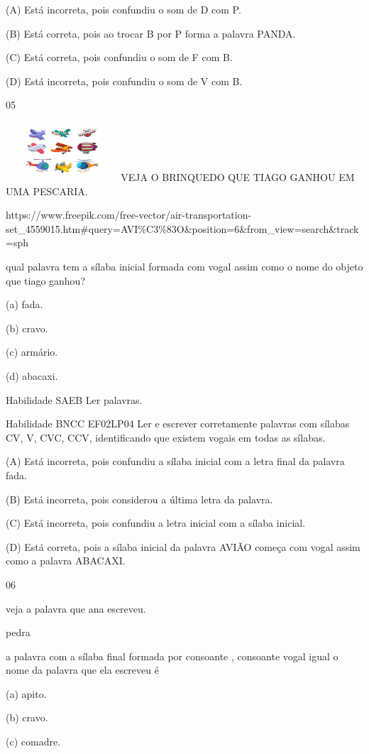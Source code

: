 {{{{{{(A) Está incorreta, pois confundiu o som de D com P.

(B) Está correta, pois ao trocar B por P forma a palavra PANDA.

(C) Está correta, pois confundiu o som de F com B.

(D) Está incorreta, pois confundiu o som de V com B.

\num{05}

\includegraphics[width=1.69097in,height=0.86538in]{media/image177.jpeg}VEJA
O BRINQUEDO QUE TIAGO GANHOU EM UMA PESCARIA.

https://www.freepik.com/free-vector/air-transportation-set\_4559015.htm\#query=AVI\%C3\%83O\&position=6\&from\_view=search\&track=sph

qual palavra tem a sílaba inicial formada com vogal assim como o nome do
objeto que tiago ganhou?

(a) fada.

(b) cravo.

(c) armário.

(d) abacaxi.

Habilidade SAEB Ler palavras.

Habilidade BNCC EF02LP04 Ler e escrever corretamente palavras com
sílabas CV, V, CVC, CCV, identificando que existem vogais em todas as
sílabas.

(A) Está incorreta, pois confundiu a sílaba inicial com a letra final da
palavra fada.

(B) Está incorreta, pois considerou a última letra da palavra.

(C) Está incorreta, pois confundiu a letra inicial com a sílaba inicial.

(D) Está correta, pois a sílaba inicial da palavra AVIÃO começa com
vogal assim como a palavra ABACAXI.

\num{06}

veja a palavra que ana escreveu.

pedra

a palavra com a sílaba final formada por consoante , consoante vogal
igual o nome da palavra que ela escreveu é

(a) apito.

(b) cravo.

(c) comadre.

}}}}}}
